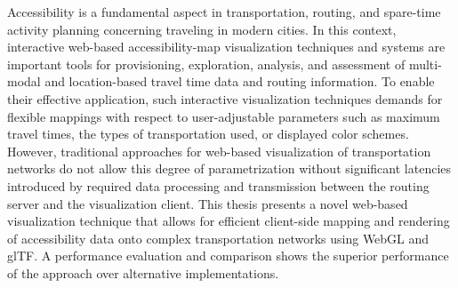 \documentclass[english]{cgsthesis}
\begin{document}
Accessibility is a fundamental aspect in transportation, routing, and spare-time activity planning concerning traveling in modern cities. In this context, interactive web-based accessibility-map visualization techniques and systems are important tools for provisioning, exploration, analysis, and assessment of multi-modal and location-based travel time data and routing information. To enable their effective application, such interactive visualization techniques  demands for flexible mappings with respect to user-adjustable parameters such as maximum travel times, the types of transportation used, or displayed color schemes. However, traditional approaches for web-based visualization of transportation networks do not allow this degree of parametrization without significant latencies introduced by required data processing and transmission between the routing server and the visualization client. This thesis presents a novel web-based visualization technique that allows for efficient client-side mapping and rendering of accessibility data onto complex transportation networks using WebGL and glTF. A performance evaluation and comparison shows the superior performance of the approach over alternative implementations.\\[1em]

\end{document}
